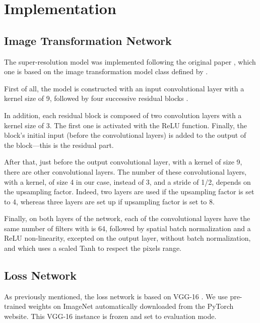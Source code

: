 \documentclass{article}
\begin{document}
{
    \section{Implementation}
    \label{sec:implementation}

    {
        \subsection{Image Transformation Network}
        \label{subsec:image-transformation-network-implementation}

        The super-resolution model was implemented following the original paper \citep{sr}, which one is based on the image transformation model class defined by \cite{image-transform-network}.

        \bigskip

        First of all, the model is constructed with an input convolutional layer with a kernel size of 9, followed by four successive residual blocks \citep{residual}.

        In addition, each residual block is composed of two convolution layers with a kernel size of 3. The first one is activated with the ReLU function. Finally, the block's initial input (before the convolutional layers) is added to the output of the block---this is the residual part.

        After that, just before the output convolutional layer, with a kernel of size 9, there are other convolutional layers. The number of these convolutional layers, with a kernel, of size 4 in our case, instead of 3, and a stride of 1/2, depends on the upsampling factor. Indeed,  two layers are used if the upsampling factor is set to 4, whereas three layers are set up if upsampling factor is set to 8.

        Finally, on both layers of the network, each of the convolutional layers have the same number of filters with is 64, followed by spatial batch normalization and a ReLU non-linearity, excepted on the output layer, without batch normalization, and which uses a scaled Tanh to respect the pixels range.
    }

    {
        \subsection{Loss Network}
        \label{subsec:loss-network-implementation}

        As previously mentioned, the loss network is based on VGG-16 \citep{vgg}. We use pre-trained weights on ImageNet \citep{image-net} automatically downloaded from the PyTorch website. This VGG-16 instance is frozen and set to evaluation mode.

}}
\end{document}
